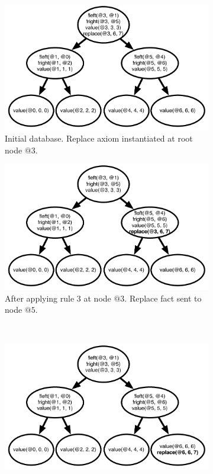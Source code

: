 \begin{figure}[h]
   \vspace{-0.75\intextsep}
        \centering
        \begin{subfigure}[b]{0.5\textwidth}
                \includegraphics[width=\textwidth]{btree_trace1}
                \caption{Initial database. Replace axiom instantiated at root node $@3$.}
                \label{fig:btree_trace1}
        \end{subfigure}%
        \begin{subfigure}[b]{0.5\textwidth}
                \includegraphics[width=\textwidth]{btree_trace2}
                \caption{After applying rule 3 at node $@3$. Replace fact sent to node $@5$.}
                \label{fig:btree_trace2}
        \end{subfigure}\\
        \begin{subfigure}[b]{0.5\textwidth}
                \includegraphics[width=\textwidth]{btree_trace3}

\end{subfigure}
\end{figure}
